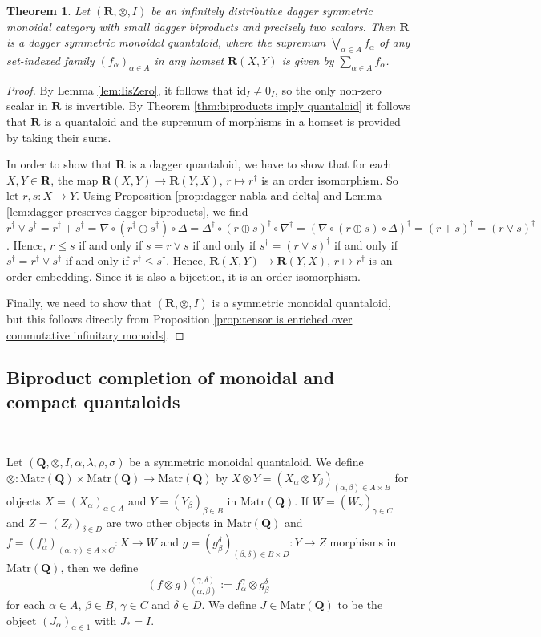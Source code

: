 \documentclass[12pt]{tac}
\newtheorem{theorem}{Theorem}[section]
\theoremstyle{definition}
\theoremstyle{remark}
\newcommand{\<}{\langle}
\renewcommand{\>}{\rangle}
\renewcommand{\:}{\colon}
\newcommand{\id}{\mathrm{id}}
\begin{document}
\begin{theorem}\label{thm:dagger biproducts imply dagger compact quantaloid}
    Let $(\mathbf R,\otimes,I)$ be an infinitely distributive dagger symmetric monoidal category with small dagger biproducts and precisely two scalars. Then $\mathbf R$ is a dagger symmetric monoidal quantaloid, where the supremum $\bigvee_{\alpha\in A}f_\alpha$ of any set-indexed family $(f_\alpha)_{\alpha\in A}$ in any homset $\mathbf R(X,Y)$ is given by $\sum_{\alpha\in A}f_\alpha$. 
\end{theorem}
\begin{proof}
By Lemma \ref{lem:IisZero}, it follows that $\id_I\neq 0_I$, so the only non-zero scalar in $\mathbf R$ is invertible. By Theorem \ref{thm:biproducts imply quantaloid} it follows that $\mathbf R$ is a quantaloid and the supremum of morphisms in a homset is provided by taking their sums. 

In order to show that $\mathbf R$ is a dagger quantaloid, we have to show that  for each $X,Y\in\mathbf R$, the map $\mathbf R(X,Y)\to\mathbf R (Y,X)$, $r\mapsto r^\dag$ is an order isomorphism.
So let $r,s:X\to Y$. Using Proposition \ref{prop:dagger nabla and delta} and Lemma \ref{lem:dagger preserves dagger biproducts}, we find 
    $r^\dag\vee s^\dag=r^\dag+s^\dag=\nabla\circ(r^\dag\oplus s^\dag)\circ\Delta=\Delta^\dag\circ(r\oplus s)^\dag\circ\nabla^\dag=(\nabla\circ (r\oplus s)\circ\Delta)^\dag=(r+s)^\dag=(r\vee s)^\dag$.
    Hence, $r\leq s$ if and only if $s=r\vee s$ if and only if $s^\dag=(r\vee s)^\dag$ if and only if $s^\dag=r^\dag\vee s^\dag$ if and only if $r^\dag\leq s^\dag$. Hence, $\mathbf R(X,Y)\to\mathbf R(Y,X)$, $r\mapsto r^\dag$ is an order embedding. Since it is also a bijection, it is an order isomorphism. 

    Finally, we need to show that $(\mathbf R,\otimes,I)$ is a symmetric monoidal quantaloid, but this follows directly from Proposition \ref{prop:tensor is enriched over commutative infinitary monoids}.
    \end{proof}    

\subsection{Biproduct completion of monoidal and compact quantaloids}\ 

\noindent Let $(\mathbf Q,\otimes,I,\alpha,\lambda,\rho,\sigma)$ be a symmetric monoidal quantaloid. We define $\otimes:\mathrm{Matr}(\mathbf Q)\times\mathrm{Matr}(\mathbf Q)\to\mathrm{Matr}(\mathbf Q)$ by $X\otimes Y=(X_\alpha\otimes Y_\beta)_{(\alpha,\beta)\in A\times B}$ for objects $X=(X_\alpha)_{\alpha\in A}$ and $Y=(Y_\beta)_{\beta\in B}$ in $\mathrm{Matr}(\mathbf Q)$. If $W=(W_\gamma)_{\gamma\in C}$ and $Z=(Z_\delta)_{\delta\in D}$ are two other objects in $\mathrm{Matr}(\mathbf Q)$ and $f=(f_\alpha^\gamma)_{(\alpha,\gamma)\in A\times C}:X\to W$ and $g=(g_{\beta}^\delta)_{(\beta,\delta)\in B\times D}:Y\to Z$ morphisms in $\mathrm{Matr}(\mathbf Q)$, then we define 
\[(f\otimes g)_{(\alpha,\beta)}^{(\gamma,\delta)}:=f_{\alpha}^{\gamma}\otimes g_{\beta}^{\delta}\] for each $\alpha\in A$, $\beta\in B$, $\gamma\in C$ and $\delta\in D$.
We define $J\in\mathrm{Matr}(\mathbf Q)$ to be the object $(J_\alpha)_{\alpha\in 1}$ with $J_*=I$. 
\end{document}
